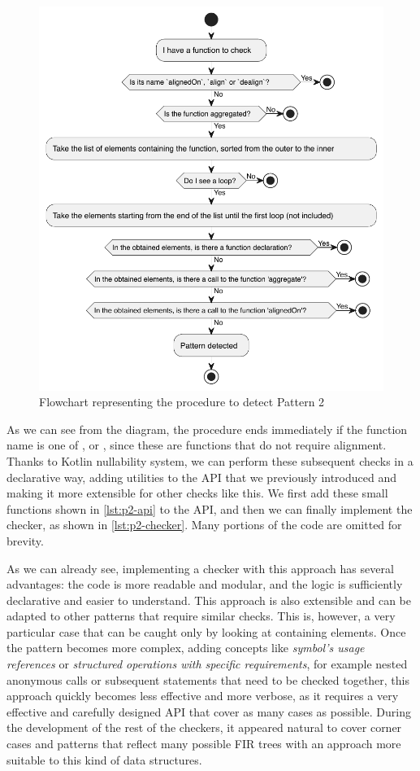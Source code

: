 \documentclass[12pt,a4paper,openright,twoside]{book}
\begin{document}
\begin{figure}
  \centering
  \includegraphics[width=.5\linewidth]{figures/p2-flowchart.pdf}
  \caption{Flowchart representing the procedure to detect Pattern 2}
  \label{fig:p2-flowchart}
\end{figure}

As we can see from the diagram, the procedure ends immediately if the function
name is one of ,  or , since these are
functions that do not require alignment. Thanks to Kotlin nullability system, we
can perform these subsequent checks in a declarative way, adding utilities to
the API that we previously introduced and making it more extensible for other
checks like this.
%
We first add these small functions shown in \cref{lst:p2-api} to the API, and
then we can finally implement the checker, as shown in \cref{lst:p2-checker}. 
Many portions of the code are omitted for brevity.





As we can already see, implementing a checker with this approach has several
advantages: the code is more readable and modular, and the logic is sufficiently
declarative and easier to understand. This approach is also extensible and can
be adapted to other patterns that require similar checks.
%
This is, however, a very particular case that can be caught only by looking at
containing elements. Once the pattern becomes more complex, adding concepts like
\emph{symbol's usage references} or \emph{structured operations with specific
requirements}, for example nested anonymous calls or subsequent statements that
need to be checked together, this approach quickly becomes less effective and
more verbose, as it requires a very effective and carefully designed API that
cover as many cases as possible. 
%
During the development of the rest of the checkers, it appeared natural to cover
corner cases and patterns that reflect many possible \ac{FIR} trees with an
approach more suitable to this kind of data structures.
\end{document}
